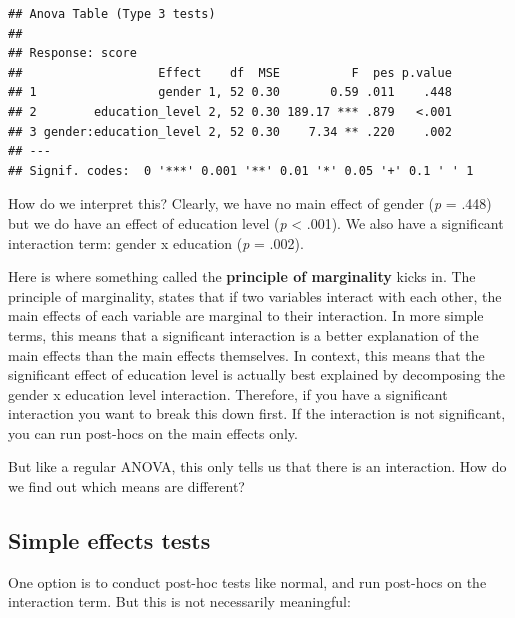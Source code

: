 \documentclass[
]{book}
\begin{document}
\begin{verbatim}
## Anova Table (Type 3 tests)
## 
## Response: score
##                   Effect    df  MSE          F  pes p.value
## 1                 gender 1, 52 0.30       0.59 .011    .448
## 2        education_level 2, 52 0.30 189.17 *** .879   <.001
## 3 gender:education_level 2, 52 0.30    7.34 ** .220    .002
## ---
## Signif. codes:  0 '***' 0.001 '**' 0.01 '*' 0.05 '+' 0.1 ' ' 1
\end{verbatim}

How do we interpret this? Clearly, we have no main effect of gender (\emph{p} = .448) but we do have an effect of education level (\emph{p} \textless{} .001). We also have a significant interaction term: gender x education (\emph{p} = .002).

Here is where something called the \textbf{principle of marginality} kicks in. The principle of marginality, states that if two variables interact with each other, the main effects of each variable are marginal to their interaction. In more simple terms, this means that a significant interaction is a better explanation of the main effects than the main effects themselves. In context, this means that the significant effect of education level is actually best explained by decomposing the gender x education level interaction. Therefore, if you have a significant interaction you want to break this down first. If the interaction is not significant, you can run post-hocs on the main effects only.

But like a regular ANOVA, this only tells us that there is an interaction. How do we find out which means are different?

\subsection{Simple effects tests}\label{simple-effects-tests}

One option is to conduct post-hoc tests like normal, and run post-hocs on the interaction term. But this is not necessarily meaningful:
\end{document}
